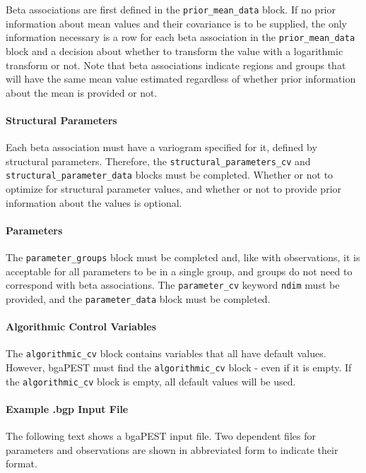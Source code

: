\documentclass[11pt,oneside,onecolumn]{usgsreport}
\begin{document}
\begin{appendix}
Beta associations are first defined in the \texttt{prior\_mean\_data}
block. If no prior information about mean values and their covariance
is to be supplied, the only information necessary is a row for each
beta association in the \texttt{prior\_mean\_data} block and a decision
about whether to transform the value with a logarithmic transform
or not. Note that beta associations indicate regions and groups that
will have the same mean value estimated regardless of whether prior
information about the mean is provided or not.


\paragraph*{Structural Parameters}

Each beta association must have a variogram specified for it, defined
by structural parameters. Therefore, the \texttt{structural\_parameters\_cv}
and \texttt{structural\_parameter\_data} blocks must be completed.
Whether or not to optimize for structural parameter values, and whether
or not to provide prior information about the values is optional.


\paragraph*{Parameters}

The \texttt{parameter\_groups} block must be completed and, like with
observations, it is acceptable for all parameters to be in a single
group, and groups do not need to correspond with beta associations.
The \texttt{parameter\_cv} keyword \texttt{ndim} must be provided,
and the \texttt{parameter\_data} block must be completed. 


\paragraph*{Algorithmic Control Variables}

The \texttt{algorithmic\_cv} block contains variables that all have
default values. However, bgaPEST must find the \texttt{algorithmic\_cv}
block - even if it is empty. If the \texttt{algorithmic\_cv} block
is empty, all default values will be used.


\paragraph*{Example .bgp Input File}

The following text shows a bgaPEST input file. Two dependent files
for parameters and observations are shown in abbreviated form to indicate
their format.
\begin{verse}
\texttt{\newline{}}
\end{verse}


\end{appendix}
\end{document}

